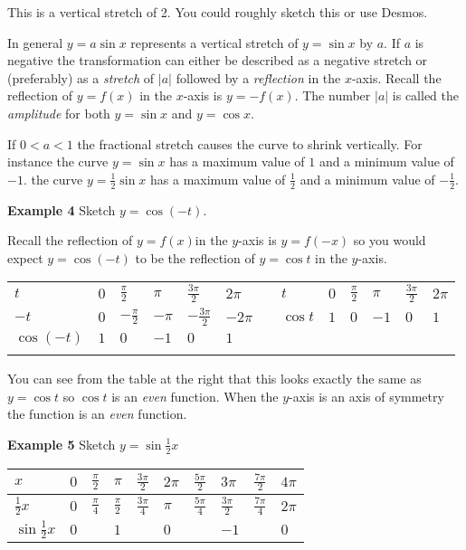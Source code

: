 This is a vertical stretch of 2. You could roughly sketch this or use Desmos. 
\setlength\fboxrule{0.01in}\setlength\fboxsep{0.2in}

In general $y =a \sin  x$ represents a vertical stretch of $y =\sin  x$ by $a$. If $a$ is negative the transformation can either be described as a negative stretch or (preferably) as a \emph{stretch}
of $\left \vert a\right \vert $ followed by a \emph{reflection} in the $x$-axis. Recall the reflection of $y =f \left (x\right )$ in the $x$-axis is $y = -f \left (x\right )$. The number $\left \vert a\right \vert $ is called the \emph{amplitude} for both $y =\sin  x$ and $y =\cos  x\text{.}$ 

If $0 <a <1$ the fractional stretch causes the curve to shrink vertically. For instance the curve
$y =\sin  x$ has a maximum value of $1$ and a minimum value of $ -1$. the curve $y =\frac{1}{2} \sin  x$ has a maximum value of $\frac{1}{2}$ and a minimum value of $ -\frac{1}{2}$. 

\textbf{Example 4} Sketch $y =\cos  ( -t)\text{.}$ 

Recall the reflection of $y =f (x)$in the $y$-axis is $y =f ( -x)$ so you would expect $y =\cos  ( -t)$ to be the reflection of $y =\cos  t$ in the $y$-axis. 

\begin{tabular}[c]{|l|l|l|l|l|l||l|l|l|l|l|l|l}
	$t$  & $0$  & $\frac{\pi }{2}$  & $\pi $  & $\frac{3 \pi }{2}$  & $2 \pi $  &  & $t$  & $0$  & $\frac{\pi }{2}$  & $\pi $  & $\frac{3 \pi }{2}$  & $2 \pi $  \\
	$ -t$  & $0$  & $ -\frac{\pi }{2}$  & $ -\pi $  & $ -\frac{3 \pi }{2}$  & $ -2 \pi $  &  & $\cos  t$  & $1$  & $0$  & $ -1$  & $0$  & $1$  \\
	$\cos  \left ( -t\right )$  & $1$  & $0$  & $ -1$  & $0$  & $1$  &  &  &  &  &  &  &  \\
	\multicolumn{1}{|l}{
	}
\end{tabular}
You can see from the table at the right that this looks exactly the same as
$y =\cos  t$ so $\cos  t$ is an \emph{even} function. When the $y$-axis is an axis of symmetry the function is an \emph{even} function. 
\setlength\fboxrule{0.01in}\setlength\fboxsep{0.2in}

\textbf{Example 5} Sketch $y =\sin  \frac{1}{2} x$ 

\begin{tabular}[c]{|l|l|l|l|l|l|l|l|l|l|}\hline
	$x$  & $0$  & $\frac{\pi }{2}$  & $\pi $  & $\frac{3 \pi }{2}$  & $2 \pi $  & $\frac{5 \pi }{2}$  & $3 \pi $  & $\frac{7 \pi }{2}$  & $4 \pi $  \\
	\hline
	$\frac{1}{2} x$  & $0$  & $\frac{\pi }{4}$  & $\frac{\pi }{2}$  & $\frac{3 \pi }{4}$  & $\pi $  & $\frac{5 \pi }{4}$  & $\frac{3 \pi }{2}$  & $\frac{7 \pi }{4}$  & $2 \pi $  \\
	\hline
	$\sin  \frac{1}{2} x$  & $0$  &  & $1$  &  & $0$  &  & $ -1$  &  & $0$  \\
	\hline
\end{tabular}

